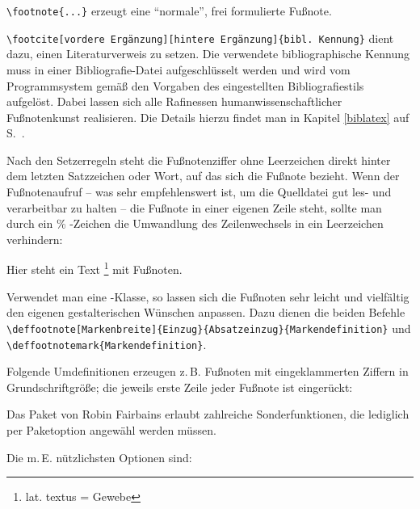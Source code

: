 \lstinline/\footnote{...}/ erzeugt eine \enquote{normale}, frei formulierte Fußnote.

\lstinline/\footcite[vordere Ergänzung][hintere Ergänzung]{bibl. Kennung}/ dient dazu,
einen Literaturverweis zu setzen. Die verwendete bibliographische Kennung muss in einer
Bibliografie-Datei aufgeschlüsselt werden und wird vom Programmsystem gemäß den Vorgaben
des eingestellten Bibliografiestils aufgelöst. Dabei lassen sich alle Rafinessen 
humanwissenschaftlicher Fußnotenkunst realisieren. 
Die Details hierzu findet man in Kapitel \ref{biblatex} auf S.~\pageref{biblatex}. 

Nach den Setzerregeln steht die Fußnotenziffer ohne Leerzeichen direkt hinter dem letzten
Satzzeichen oder Wort, auf das sich die Fußnote bezieht.
Wenn der Fußnotenaufruf -- was sehr empfehlenswert ist, um die Quelldatei gut les- und 
verarbeitbar zu halten -- die Fußnote in einer eigenen Zeile steht, sollte man durch ein 
\% -Zeichen die Umwandlung des Zeilenwechsels in ein Leerzeichen verhindern:

\begin{lfgwcode}{}
 Hier steht ein Text%
 \footnote{lat. textus = Gewebe}
 mit Fußnoten.
\end{lfgwcode}



Verwendet man eine \KOMAScript -Klasse, so lassen sich die Fußnoten sehr leicht und vielfältig
den eigenen gestalterischen Wünschen anpassen. Dazu dienen die beiden Befehle
\lstinline/\deffootnote[Markenbreite]{Einzug}{Absatzeinzug}{Markendefinition}/
und 
\lstinline/\deffootnotemark{Markendefinition}/.

Folgende Umdefinitionen erzeugen z.\,B. Fußnoten mit eingeklammerten Ziffern 
in Grundschriftgröße; die jeweils erste Zeile jeder Fußnote ist eingerückt:

\begin{lfgwcode}{}
\end{lfgwcode}



Das Paket  von Robin Fairbains erlaubt zahlreiche Sonderfunktionen, die 
lediglich per Paketoption angewähl werden müssen.

Die m.\,E. nützlichsten Optionen sind:

